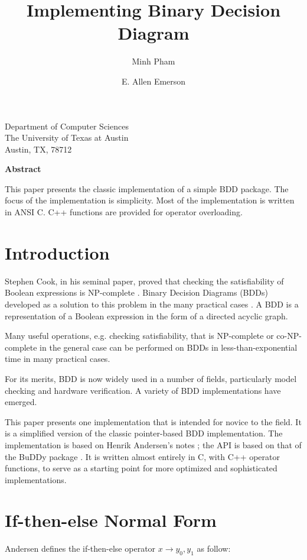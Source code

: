 \documentclass[12pt]{article}
\author{Minh Pham\and E. Allen Emerson}
\title{Implementing Binary Decision Diagram}
\date{}
\begin{document}
\maketitle 
\begin{center}
Department of Computer Sciences\\
The University of Texas at Austin\\
Austin, TX, 78712
\end{center}  
\begin{center} \textbf{ Abstract } \end{center}
This paper presents the classic implementation of a simple BDD package. The focus of the implementation is simplicity. Most of the implementation is written in ANSI C. C++ functions are provided for operator overloading.

\section{Introduction}
Stephen Cook, in his seminal paper, proved that checking the satisfiability of Boolean	expressions is NP-complete \cite{cook71}. Binary Decision Diagrams (BDDs) developed as a solution to this problem in the many practical cases \cite{bryant86}. A BDD is a representation of a Boolean expression in the form of a directed acyclic graph.   

Many useful operations, e.g. checking satisfiability, that is NP-complete or co-NP-complete in the general case can be performed on BDDs in less-than-exponential time in many practical cases.
  
For its merits, BDD is now widely used in a number of fields, particularly model checking and hardware verification. A variety of BDD implementations have emerged. 
  
This paper presents one implementation that is intended for novice to the field.
It is a simplified version of the classic pointer-based BDD implementation. 
The implementation is based on Henrik Andersen's notes \cite{andersen99}; the API is based on that of the BuDDy package \cite{buddy}.
It is written almost entirely in C, with C++ operator functions, to serve as a starting point for more optimized and sophisticated implementations.

\section{If-then-else Normal Form}
Andersen defines the if-then-else operator $x \rightarrow y_0, y_1$ as follow:
\end{document}
